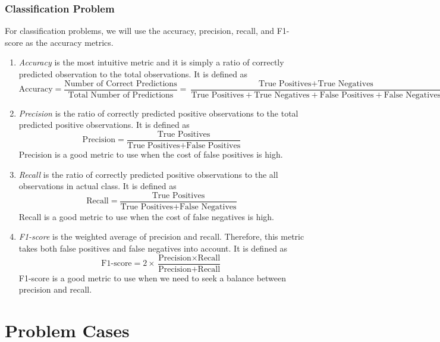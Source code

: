 \documentclass[conf]{new-aiaa}
\begin{document}
\subsubsection{Classification Problem}
For classification problems, we will use the accuracy, precision, recall, and F1-score as the accuracy metrics.
\begin{enumerate}
\item \textit{Accuracy} is the most intuitive metric and it is simply a ratio of correctly predicted observation to the total observations. It is defined as
\begin{equation} \label{eq:accuracy}
    \textrm{Accuracy} = \frac{\textrm{Number of Correct Predictions}}{\textrm{Total Number of Predictions}} = \frac{\textrm{True Positives} + \textrm{True Negatives}}{\textrm{True Positives} + \textrm{True Negatives} + \textrm{False Positives} + \textrm{False Negatives}}
\end{equation}
\item \textit{Precision} is the ratio of correctly predicted positive observations to the total predicted positive observations. It is defined as
\begin{equation} \label{eq:precision}
    \textrm{Precision} = \frac{\textrm{True Positives}}{\textrm{True Positives} + \textrm{False Positives}}
\end{equation}
Precision is a good metric to use when the cost of false positives is high.
\item \textit{Recall} is the ratio of correctly predicted positive observations to the all observations in actual class. It is defined as
\begin{equation} \label{eq:recall}
    \textrm{Recall} = \frac{\textrm{True Positives}}{\textrm{True Positives} + \textrm{False Negatives}}
\end{equation}
Recall is a good metric to use when the cost of false negatives is high.
\item \textit{F1-score} is the weighted average of precision and recall. Therefore, this metric takes both false positives and false negatives into account. It is defined as
\begin{equation} \label{eq:f1score}
    \textrm{F1-score} = 2 \times \frac{\textrm{Precision} \times \textrm{Recall}}{\textrm{Precision} + \textrm{Recall}}
\end{equation}
F1-score is a good metric to use when we need to seek a balance between precision and recall.
\end{enumerate}
\section{Problem Cases}
\end{document}
